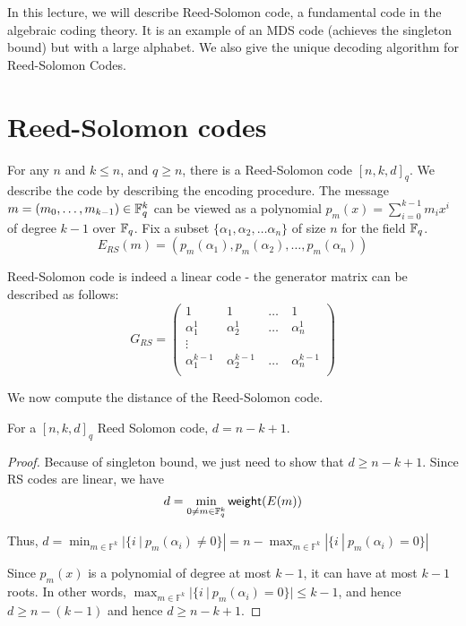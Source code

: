 
In this lecture, we will describe Reed-Solomon code, a fundamental code in the algebraic coding theory. It is an example of an MDS code (achieves the singleton bound) but with a large alphabet. We also give the unique decoding algorithm for Reed-Solomon Codes.

\section{Reed-Solomon codes}

For any $n$ and $k \le n$, and $q \ge n$, there is a Reed-Solomon code $[n,k,d]_q$. We describe the code by describing the encoding procedure. The message $m=(m_0,\ldots, m_{k-1}) \in {\mathbb{F}}_q^{k} $ can be viewed as a polynomial $p_m(x) =\sum_{i=0}^{k-1}m_ix^i$ of degree
		$k-1$ over ${\mathbb{F}}_q$. Fix a subset $\{\alpha_1, \alpha_2, \ldots \alpha_n\}$ of size $n$ for the field ${\mathbb{F}}_q$.
$$E_{RS}(m) = \left(p_m(\alpha_1), p_m(\alpha_2), \dots, p_m(\alpha_n)\right)$$

Reed-Solomon code is indeed a linear code - the generator matrix can be described as follows:
\[
G_{RS} =
\begin{pmatrix}
1 & 1 & \dots\ & 1\\
\alpha_{1}^1\ & \alpha_{2}^1\ & \dots\ & \alpha_{n}^{1}\\
\vdots\\
\alpha_{1}^{k-1}\ & \alpha_{2}^{k-1}\ & \dots\ &\alpha_n^{k-1}\\
\end{pmatrix}
\]

\noindent We now compute the distance of the Reed-Solomon code.
\begin{lemma}
For a  $[n,k,d]_q$ Reed Solomon code, $d = n-k+1$.
\end{lemma}
\begin{proof}
Because of singleton bound, we just need to show that $d \ge n-k+1$. Since RS codes are linear, we have
\[d = \min_{0\neq m \in {\mathbb{F}}_q^k} \mathsf{weight}(E(m))\]

Thus, $d = \min_{m\in {\mathbb{F}}^k} |\{ i~|~p_m(\alpha_i)\neq 0 \}| = n-\max_{m\in {\mathbb F}^k } | \{ i~|~p_m(\alpha_i)= 0 \}|$

Since $p_m(x)$ is a polynomial of degree at most $k-1$, it can have at most $k-1$ roots. In other words, $\max_{m\in {\mathbb F}^k } | \{ i~|~p_m(\alpha_i)= 0 \}|\le k-1$, and hence $d \ge n-(k-1)$ and hence $d \ge n-k+1$.
\end{proof}
    


